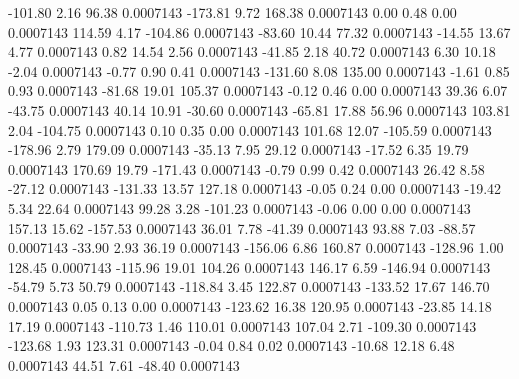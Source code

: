      -101.80        2.16       96.38     0.0007143
     -173.81        9.72      168.38     0.0007143
        0.00        0.48        0.00     0.0007143
      114.59        4.17     -104.86     0.0007143
      -83.60       10.44       77.32     0.0007143
      -14.55       13.67        4.77     0.0007143
        0.82       14.54        2.56     0.0007143
      -41.85        2.18       40.72     0.0007143
        6.30       10.18       -2.04     0.0007143
       -0.77        0.90        0.41     0.0007143
     -131.60        8.08      135.00     0.0007143
       -1.61        0.85        0.93     0.0007143
      -81.68       19.01      105.37     0.0007143
       -0.12        0.46        0.00     0.0007143
       39.36        6.07      -43.75     0.0007143
       40.14       10.91      -30.60     0.0007143
      -65.81       17.88       56.96     0.0007143
      103.81        2.04     -104.75     0.0007143
        0.10        0.35        0.00     0.0007143
      101.68       12.07     -105.59     0.0007143
     -178.96        2.79      179.09     0.0007143
      -35.13        7.95       29.12     0.0007143
      -17.52        6.35       19.79     0.0007143
      170.69       19.79     -171.43     0.0007143
       -0.79        0.99        0.42     0.0007143
       26.42        8.58      -27.12     0.0007143
     -131.33       13.57      127.18     0.0007143
       -0.05        0.24        0.00     0.0007143
      -19.42        5.34       22.64     0.0007143
       99.28        3.28     -101.23     0.0007143
       -0.06        0.00        0.00     0.0007143
      157.13       15.62     -157.53     0.0007143
       36.01        7.78      -41.39     0.0007143
       93.88        7.03      -88.57     0.0007143
      -33.90        2.93       36.19     0.0007143
     -156.06        6.86      160.87     0.0007143
     -128.96        1.00      128.45     0.0007143
     -115.96       19.01      104.26     0.0007143
      146.17        6.59     -146.94     0.0007143
      -54.79        5.73       50.79     0.0007143
     -118.84        3.45      122.87     0.0007143
     -133.52       17.67      146.70     0.0007143
        0.05        0.13        0.00     0.0007143
     -123.62       16.38      120.95     0.0007143
      -23.85       14.18       17.19     0.0007143
     -110.73        1.46      110.01     0.0007143
      107.04        2.71     -109.30     0.0007143
     -123.68        1.93      123.31     0.0007143
       -0.04        0.84        0.02     0.0007143
      -10.68       12.18        6.48     0.0007143
       44.51        7.61      -48.40     0.0007143
